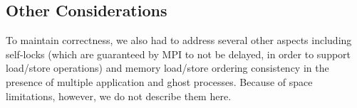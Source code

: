 








\subsection{Other Considerations}

To maintain correctness, we also had to address several other aspects
including self-locks (which are guaranteed by MPI to not be delayed, in
order to support load\slash store operations) and memory
load\slash store
ordering consistency in the presence of multiple application and ghost
processes.  Because of space limitations, however, we do not describe them
here.
